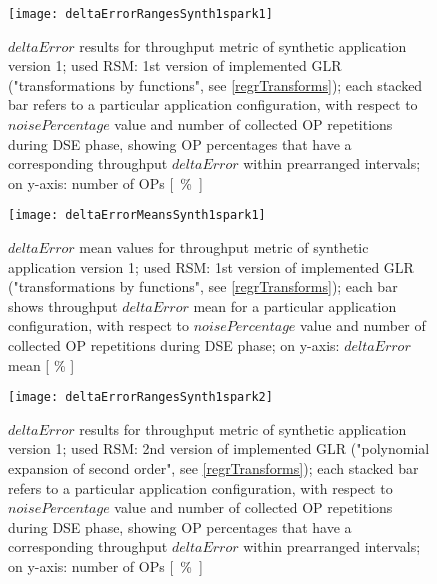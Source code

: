 \begin{figure}[H]

    \centering
    
    \texttt{[image: deltaErrorRangesSynth1spark1]}
    
     \caption{$deltaError$ results for throughput metric of synthetic application version 1; used RSM: 1st version of implemented GLR ("transformations by functions", see \ref{regrTransforms}); each stacked bar refers to a particular application configuration, with respect to $noisePercentage$ value and number of collected OP repetitions during DSE phase, showing OP percentages that have a corresponding throughput $deltaError$ within prearranged intervals; on y-axis: number of OPs \hbox{[ \% ]}}
    
    \label{fig::synth1spark1::intervals}
    
\end{figure}

\begin{figure}[H]

    \centering
    
    \texttt{[image: deltaErrorMeansSynth1spark1]}
    
    \caption{$deltaError$ mean values for throughput metric of synthetic application version 1; used RSM: 1st version of implemented GLR ("transformations by functions", see \ref{regrTransforms}); each bar shows throughput $deltaError$ mean for a particular application configuration, with respect to $noisePercentage$ value and number of collected OP repetitions during DSE phase; on y-axis: $deltaError$ mean [ \% ]}
    
    \label{fig::synth1spark1::means}
    
\end{figure}





\begin{figure}[H]

    \centering
    
    \texttt{[image: deltaErrorRangesSynth1spark2]}
    
     \caption{$deltaError$ results for throughput metric of synthetic application version 1; used RSM: 2nd version of implemented GLR ("polynomial expansion of second order", see \ref{regrTransforms}); each stacked bar refers to a particular application configuration, with respect to $noisePercentage$ value and number of collected OP repetitions during DSE phase, showing OP percentages that have a corresponding throughput $deltaError$ within prearranged intervals; on y-axis: number of OPs \hbox{[ \% ]}}
    
    \label{fig::synth1spark2::intervals}
    
\end{figure}

